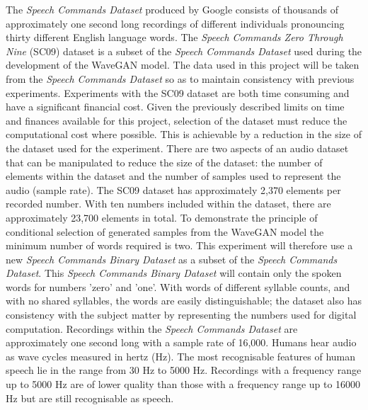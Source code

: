 \documentclass[a4paper, dvipsnames, titlepage]{article}
\begin{document}
The \textit{Speech Commands Dataset} \citep{speechcommands} produced by Google consists of thousands of approximately one second long recordings of different individuals pronouncing thirty different English language words.
The \textit{Speech Commands Zero Through Nine} (SC09) dataset is a subset of the \textit{Speech Commands Dataset} used during the development of the WaveGAN model.
The data used in this project will be taken from the \textit{Speech Commands Dataset} so as to maintain consistency with previous experiments.
\newline
\newline
Experiments with the SC09 dataset are both time consuming and have a significant financial cost.
Given the previously described limits on time and finances available for this project, selection of the dataset must reduce the computational cost where possible.
This is achievable by a reduction in the size of the dataset used for the experiment.
There are two aspects of an audio dataset that can be manipulated to reduce the size of the dataset: the number of elements within the dataset and the number of samples used to represent the audio (sample rate).
\newline
\newline
The SC09 dataset has approximately 2,370 elements per recorded number.
With ten numbers included within the dataset, there are approximately 23,700 elements in total.
To demonstrate the principle of conditional selection of generated samples from the WaveGAN model the minimum number of words required is two.
This experiment will therefore use a new \textit{Speech Commands Binary Dataset} as a subset of the \textit{Speech Commands Dataset}.
\newline
\newline
This \textit{Speech Commands Binary Dataset} will contain only the spoken words for numbers 'zero' and 'one'.
With words of different syllable counts, and with no shared syllables, the words are easily distinguishable; the dataset also has consistency with the subject matter by representing the numbers used for digital computation.
\newline
\newline
Recordings within the \textit{Speech Commands Dataset} are approximately one second long with a sample rate of 16,000.
Humans hear audio as wave cycles measured in hertz (Hz).
The most recognisable features of human speech lie in the range from 30 Hz to 5000 Hz.
Recordings with a frequency range up to 5000 Hz are of lower quality than those with a frequency range up to 16000 Hz but are still recognisable as speech.
\end{document}
